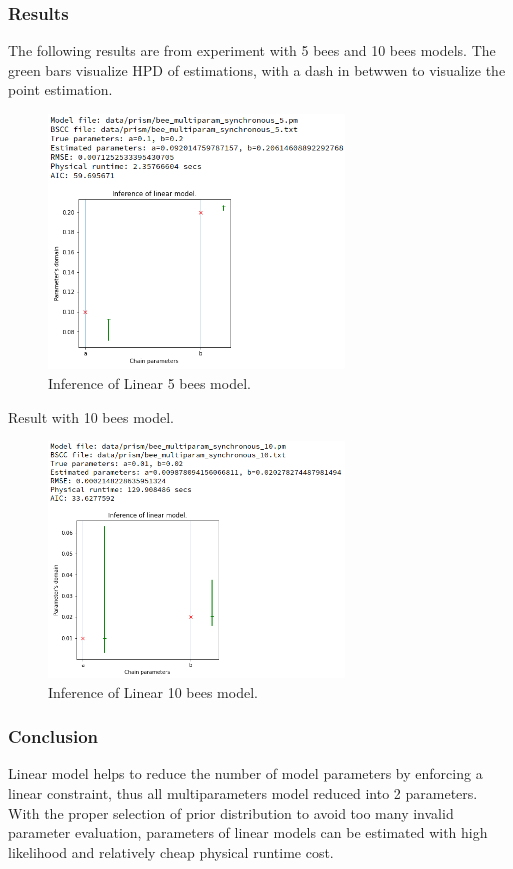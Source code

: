 \documentclass[12pt]{article}
\theoremstyle{definition}
\begin{document}
\subsubsection{Results}
The following results are from experiment with 5 bees  and 10 bees models. The
green bars visualize HPD of estimations, with a dash in betwwen to visualize the
point estimation.
\begin{figure}[H]
  \centering
  \includegraphics[width=0.7\textwidth,keepaspectratio]{figures/linear_1.png}
  \caption{Inference of Linear 5 bees model.}
\end{figure}
Result with 10 bees model.
\begin{figure}[H]
  \centering
  \includegraphics[width=0.7\textwidth,keepaspectratio]{figures/linear_2.png}
  \caption{Inference of Linear 10 bees model.}
\end{figure}

\subsubsection{Conclusion}
Linear model helps to reduce the number of model parameters by enforcing a
linear constraint, thus all multiparameters model reduced into 2 parameters.
With the proper selection of prior distribution to avoid too many invalid
parameter evaluation, parameters of linear models can be estimated with high
likelihood and relatively cheap physical runtime cost.
\end{document}
